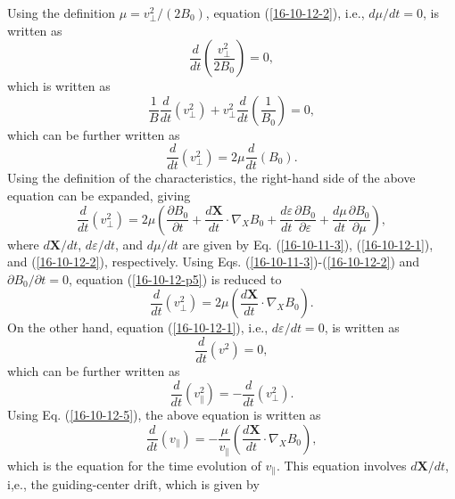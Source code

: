 \documentclass{article}
\begin{document}
Using the definition $\mu = v_{\perp}^2 / (2 B_0)$, equation
(\ref{16-10-12-2}), i.e., $d \mu / d t = 0$, is written as
\begin{equation}
  \frac{d}{d t} \left( \frac{v_{\perp}^2}{2 B_0} \right) = 0,
\end{equation}
which is written as
\begin{equation}
  \frac{1}{B}  \frac{d}{d t} (v_{\perp}^2) + v_{\perp}^2  \frac{d}{d t}
  (\frac{1}{B_0}) = 0,
\end{equation}
which can be further written as
\begin{equation}
  \frac{d}{d t} (v_{\perp}^2) = 2 \mu \frac{d}{d t} (B_0) .
\end{equation}
Using the definition of the characteristics, the right-hand side of the above
equation can be expanded, giving
\begin{equation}
  \label{16-10-12-p5} \frac{d}{d t} (v_{\perp}^2) = 2 \mu \left(
  \frac{\partial B_0}{\partial t} + \frac{d\mathbf{X}}{d t} \cdot \nabla_X B_0
  + \frac{d \varepsilon}{d t}  \frac{\partial B_0}{\partial \varepsilon} +
  \frac{d \mu}{d t}  \frac{\partial B_0}{\partial \mu} \right),
\end{equation}
where $d\mathbf{X}/ d t$, $d \varepsilon / d t$, and $d \mu / d t$ are given
by Eq. (\ref{16-10-11-3}), (\ref{16-10-12-1}), and (\ref{16-10-12-2}),
respectively. Using Eqs. (\ref{16-10-11-3})-(\ref{16-10-12-2}) and $\partial
B_0 / \partial t = 0$, equation (\ref{16-10-12-p5}) is reduced to
\begin{equation}
  \label{16-10-12-5} \frac{d}{d t} (v_{\perp}^2) = 2 \mu \left(
  \frac{d\mathbf{X}}{d t} \cdot \nabla_X B_0 \right) .
\end{equation}
On the other hand, equation (\ref{16-10-12-1}), i.e., $d \varepsilon / d t =
0$, is written as
\begin{equation}
  \frac{d}{d t} (v^2) = 0,
\end{equation}
which can be further written as
\begin{equation}
  \frac{d}{d t} (v^2_{\parallel}) = - \frac{d}{d t} (v^2_{\perp}) .
\end{equation}
Using Eq. (\ref{16-10-12-5}), the above equation is written as
\begin{equation}
  \label{16-10-12-p1} \frac{d}{d t} (v_{\parallel}) = -
  \frac{\mu}{v_{\parallel}} \left( \frac{d\mathbf{X}}{d t} \cdot \nabla_X B_0
  \right),
\end{equation}
which is the equation for the time evolution of $v_{\parallel}$. This equation
involves $d\mathbf{X}/ d t$, i,e., the guiding-center drift, which is given by
\end{document}
